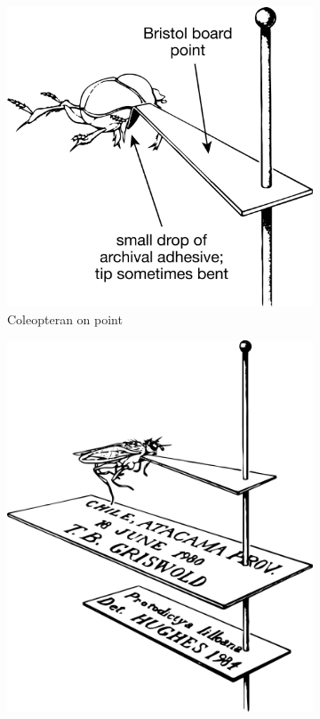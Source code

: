 \begin{figure}[ht!]
    \centering
    \begin{subfigure}[ht!]{0.38\textwidth}
        \includegraphics[width=\textwidth]{sections/img/specimenPreps/pointedBeetle}
        \caption{Coleopteran on point \citep[adapted from][Fig. 18C]{USDAmanual1986}}
        \label{fig:beetlepoint}
    \end{subfigure}
    \qquad
    \begin{subfigure}[ht!]{0.31\textwidth}
        \includegraphics[width=\textwidth]{sections/img/specimenPreps/pointedFly}

\end{subfigure}
\end{figure}
